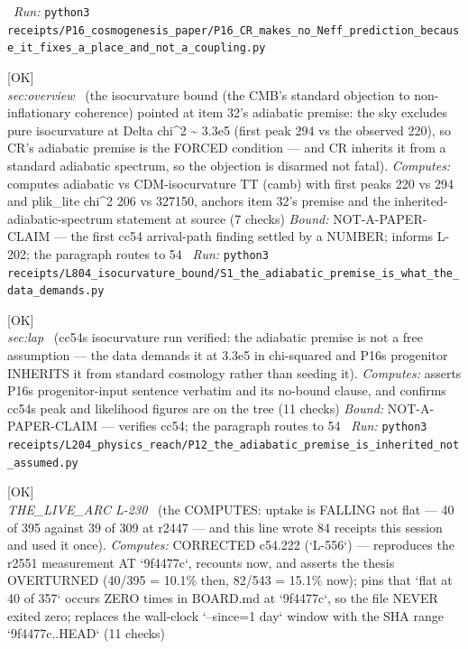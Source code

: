 \begin{description}
\ \emph{Run:} \texttt{python3 receipts/P16\_cosmogenesis\_paper/P16\_CR\_makes\_no\_Neff\_prediction\_because\_it\_fixes\_a\_place\_and\_not\_a\_coupling.py}
\item[\label{rcpt:S1_the_adiabatic_premise_is_what_the_data_demands}\texttt{S1\_the\_adiabatic\_premise\_is\_what\_the\_data\_demands}]\hfill\textsf{[OK]}\\
\textit{sec:overview} \ (the isocurvature bound (the CMB's standard objection to non-inflationary coherence) pointed at item 32's adiabatic premise: the sky excludes pure isocurvature at Delta chi\textasciicircum{}2 \textasciitilde{} 3.3e5 (first peak 294 vs the observed 220), so CR's adiabatic premise is the FORCED condition --- and CR inherits it from a standard adiabatic spectrum, so the objection is disarmed not fatal). 
\emph{Computes:} computes adiabatic vs CDM-isocurvature TT (camb) with first peaks 220 vs 294 and plik\_lite chi\textasciicircum{}2 206 vs 327150, anchors item 32's premise and the inherited-adiabatic-spectrum statement at source (7 checks)
 \emph{Bound:} NOT-A-PAPER-CLAIM --- the first cc54 arrival-path finding settled by a NUMBER; informs L-202; the paragraph routes to 54
\ \emph{Run:} \texttt{python3 receipts/L804\_isocurvature\_bound/S1\_the\_adiabatic\_premise\_is\_what\_the\_data\_demands.py}
\item[\label{rcpt:P12_the_adiabatic_premise_is_inherited_not_assumed}\texttt{P12\_the\_adiabatic\_premise\_is\_inherited\_not\_assumed}]\hfill\textsf{[OK]}\\
\textit{sec:lap} \ (cc54s isocurvature run verified: the adiabatic premise is not a free assumption --- the data demands it at 3.3e5 in chi-squared and P16s progenitor INHERITS it from standard cosmology rather than seeding it). 
\emph{Computes:} asserts P16s progenitor-input sentence verbatim and its no-bound clause, and confirms cc54s peak and likelihood figures are on the tree (11 checks)
 \emph{Bound:} NOT-A-PAPER-CLAIM --- verifies cc54; the paragraph routes to 54
\ \emph{Run:} \texttt{python3 receipts/L204\_physics\_reach/P12\_the\_adiabatic\_premise\_is\_inherited\_not\_assumed.py}
\item[\label{rcpt:C1_the_uptake_is_falling_and_this_line_is_why}\texttt{C1\_the\_uptake\_is\_falling\_and\_this\_line\_is\_why}]\hfill\textsf{[OK]}\\
\textit{THE\_LIVE\_ARC L-230} \ (the COMPUTES: uptake is FALLING not flat --- 40 of 395 against 39 of 309 at r2447 --- and this line wrote 84 receipts this session and used it once). 
\emph{Computes:} CORRECTED c54.222 (`L-556`) --- reproduces the r2551 measurement AT `9f4477c`, recounts now, and asserts the thesis OVERTURNED (40/395 = 10.1\% then, 82/543 = 15.1\% now); pins that `flat at 40 of 357` occurs ZERO times in BOARD.md at `9f4477c`, so the file NEVER exited zero; replaces the wall-clock `--since=1 day` window with the SHA range `9f4477c..HEAD` (11 checks)

\end{description}
